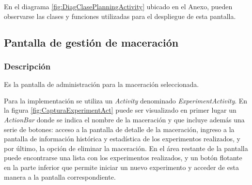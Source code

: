                 \par En el diagrama \ref{fig:DiagClasePlanningActivity} ubicado en el Anexo, pueden observarse las clases y funciones utilizadas para el despliegue de esta pantalla.
        
        \subsection{Pantalla de gestión de maceración}
        \label{DescripPantallaGestiónMaceración}
            \subsubsection{Descripción}
                \par Es la pantalla de administración para la maceración seleccionada.
                \par Para la implementación se utiliza un \textit{Activity} denominado \textit{ExperimentActivity}. En la figura \ref{fig:CapturaExperimentAct} puede ser visualizado en primer lugar un \textit{ActionBar} donde se indica el nombre de la maceración y que incluye además una serie de botones: acceso a la pantalla de detalle de la maceración, ingreso a la pantalla de información histórica y estadística de los experimentos realizados, y por último, la opción de eliminar la maceración. En el área restante de la pantalla puede encontrarse una lista con los experimentos realizados, y un botón flotante en la parte inferior que permite iniciar un nuevo experimento y acceder de esta manera a la pantalla correspondiente.

